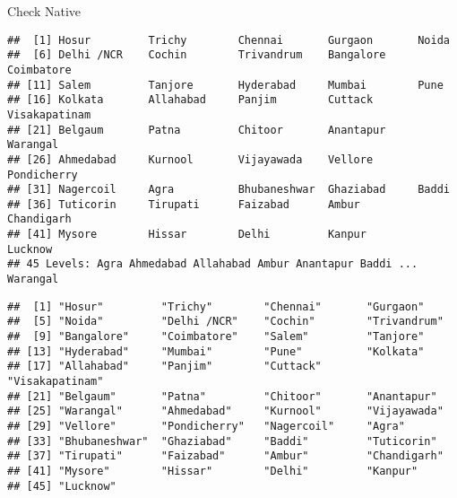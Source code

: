 \documentclass[]{article}
\newenvironment{Shaded}{\begin{snugshade}}{\end{snugshade}}
\newcommand{\KeywordTok}[1]{\textcolor[rgb]{0.13,0.29,0.53}{\textbf{#1}}}
\newcommand{\StringTok}[1]{\textcolor[rgb]{0.31,0.60,0.02}{#1}}
\newcommand{\CommentTok}[1]{\textcolor[rgb]{0.56,0.35,0.01}{\textit{#1}}}
\newcommand{\OperatorTok}[1]{\textcolor[rgb]{0.81,0.36,0.00}{\textbf{#1}}}
\newcommand{\NormalTok}[1]{#1}
\begin{document}
Check Native

\begin{Shaded}
\end{Shaded}

\begin{verbatim}
##  [1] Hosur         Trichy        Chennai       Gurgaon       Noida        
##  [6] Delhi /NCR    Cochin        Trivandrum    Bangalore     Coimbatore   
## [11] Salem         Tanjore       Hyderabad     Mumbai        Pune         
## [16] Kolkata       Allahabad     Panjim        Cuttack       Visakapatinam
## [21] Belgaum       Patna         Chitoor       Anantapur     Warangal     
## [26] Ahmedabad     Kurnool       Vijayawada    Vellore       Pondicherry  
## [31] Nagercoil     Agra          Bhubaneshwar  Ghaziabad     Baddi        
## [36] Tuticorin     Tirupati      Faizabad      Ambur         Chandigarh   
## [41] Mysore        Hissar        Delhi         Kanpur        Lucknow      
## 45 Levels: Agra Ahmedabad Allahabad Ambur Anantapur Baddi ... Warangal
\end{verbatim}

\begin{Shaded}
\end{Shaded}

\begin{verbatim}
##  [1] "Hosur"         "Trichy"        "Chennai"       "Gurgaon"      
##  [5] "Noida"         "Delhi /NCR"    "Cochin"        "Trivandrum"   
##  [9] "Bangalore"     "Coimbatore"    "Salem"         "Tanjore"      
## [13] "Hyderabad"     "Mumbai"        "Pune"          "Kolkata"      
## [17] "Allahabad"     "Panjim"        "Cuttack"       "Visakapatinam"
## [21] "Belgaum"       "Patna"         "Chitoor"       "Anantapur"    
## [25] "Warangal"      "Ahmedabad"     "Kurnool"       "Vijayawada"   
## [29] "Vellore"       "Pondicherry"   "Nagercoil"     "Agra"         
## [33] "Bhubaneshwar"  "Ghaziabad"     "Baddi"         "Tuticorin"    
## [37] "Tirupati"      "Faizabad"      "Ambur"         "Chandigarh"   
## [41] "Mysore"        "Hissar"        "Delhi"         "Kanpur"       
## [45] "Lucknow"
\end{verbatim}
\end{document}
